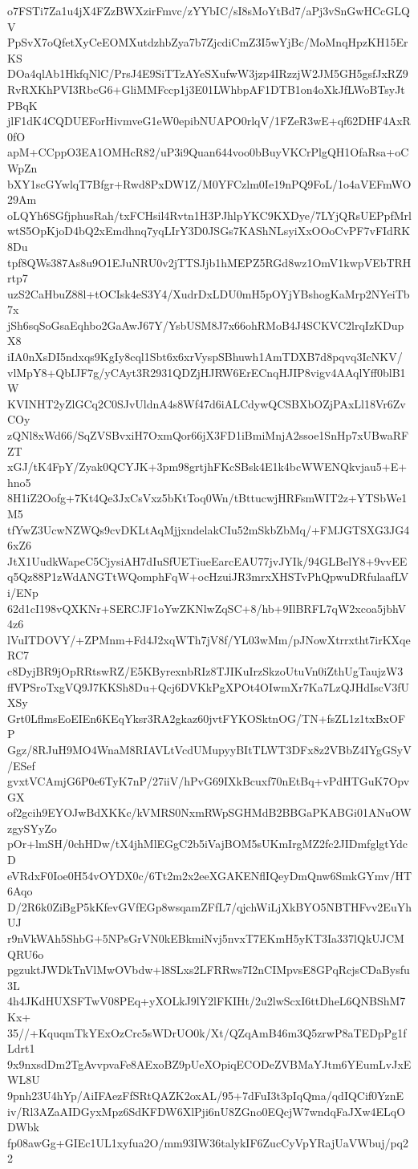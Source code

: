 o7FSTi7Za1u4jX4FZzBWXzirFmvc/zYYbIC/sI8sMoYtBd7/aPj3vSnGwHCcGLQV
PpSvX7oQfetXyCeEOMXutdzhbZya7b7ZjcdiCmZ3I5wYjBc/MoMnqHpzKH15ErKS
DOa4qlAb1HkfqNlC/PrsJ4E9SiTTzAYeSXufwW3jzp4IRzzjW2JM5GH5gsfJxRZ9
RvRXKhPVI3RbcG6+GliMMFccp1j3E01LWhbpAF1DTB1on4oXkJfLWoBTsyJtPBqK
jlF1dK4CQDUEForHivmveG1eW0epibNUAPO0rlqV/1FZeR3wE+qf62DHF4AxR0fO
apM+CCppO3EA1OMHcR82/uP3i9Quan644voo0bBuyVKCrPlgQH1OfaRsa+oCWpZn
bXY1scGYwlqT7Bfgr+Rwd8PxDW1Z/M0YFCzlm0Ie19nPQ9FoL/1o4aVEFmWO29Am
oLQYh6SGfjphusRah/txFCHsil4Rvtn1H3PJhlpYKC9KXDye/7LYjQRsUEPpfMrl
wtS5OpKjoD4bQ2xEmdhnq7yqLIrY3D0JSGs7KAShNLsyiXxOOoCvPF7vFIdRK8Du
tpf8QWs387As8u9O1EJuNRU0v2jTTSJjb1hMEPZ5RGd8wz1OmV1kwpVEbTRHrtp7
uzS2CaHbuZ88l+tOCIsk4eS3Y4/XudrDxLDU0mH5pOYjYBshogKaMrp2NYeiTb7x
jSh6sqSoGsaEqhbo2GaAwJ67Y/YsbUSM8J7x66ohRMoB4J4SCKVC2lrqIzKDupX8
iIA0nXsDI5ndxqs9KgIy8cql1Sbt6x6xrVyspSBhuwh1AmTDXB7d8pqvq3IcNKV/
vlMpY8+QbIJF7g/yCAyt3R2931QDZjHJRW6ErECnqHJIP8vigv4AAqlYff0blB1W
KVINHT2yZlGCq2C0SJvUldnA4s8Wf47d6iALCdywQCSBXbOZjPAxLl18Vr6ZvCOy
zQNl8xWd66/SqZVSBvxiH7OxmQor66jX3FD1iBmiMnjA2ssoe1SnHp7xUBwaRFZT
xGJ/tK4FpY/Zyak0QCYJK+3pm98grtjhFKcSBsk4E1k4bcWWENQkvjau5+E+hno5
8H1iZ2Oofg+7Kt4Qe3JxCsVxz5bKtToq0Wn/tBttucwjHRFsmWIT2z+YTSbWe1M5
tfYwZ3UcwNZWQs9cvDKLtAqMjjxndelakCIu52mSkbZbMq/+FMJGTSXG3JG46xZ6
JtX1UudkWapeC5CjysiAH7dIuSfUETiueEarcEAU77jvJYIk/94GLBelY8+9vvEE
q5Qz88P1zWdANGTtWQomphFqW+ocHzuiJR3mrxXHSTvPhQpwuDRfulaafLVi/ENp
62d1cI198vQXKNr+SERCJF1oYwZKNlwZqSC+8/hb+9IlBRFL7qW2xcoa5jbhV4z6
lVuITDOVY/+ZPMnm+Fd4J2xqWTh7jV8f/YL03wMm/pJNowXtrrxtht7irKXqeRC7
c8DyjBR9jOpRRtswRZ/E5KByrexnbRIz8TJIKuIrzSkzoUtuVn0iZthUgTaujzW3
ffVPSroTxgVQ9J7KKSh8Du+Qcj6DVKkPgXPOt4OIwmXr7Ka7LzQJHdIscV3fUXSy
Grt0LflmsEoEIEn6KEqYksr3RA2gkaz60jvtFYKOSktnOG/TN+fsZL1z1txBxOFP
Ggz/8RJuH9MO4WnaM8RIAVLtVcdUMupyyBItTLWT3DFx8z2VBbZ4IYgGSyV/ESef
gvxtVCAmjG6P0e6TyK7nP/27iiV/hPvG69IXkBcuxf70nEtBq+vPdHTGuK7OpvGX
of2gcih9EYOJwBdXKKc/kVMRS0NxmRWpSGHMdB2BBGaPKABGi01ANuOWzgySYyZo
pOr+lmSH/0chHDw/tX4jhMlEGgC2b5iVajBOM5sUKmIrgMZ2fc2JIDmfglgtYdcD
eVRdxF0Ioe0H54vOYDX0c/6Tt2m2x2eeXGAKENflIQeyDmQnw6SmkGYmv/HT6Aqo
D/2R6k0ZiBgP5kKfevGVfEGp8wsqamZFfL7/qjchWiLjXkBYO5NBTHFvv2EuYhUJ
r9nVkWAh5ShbG+5NPsGrVN0kEBkmiNvj5nvxT7EKmH5yKT3Ia337lQkUJCMQRU6o
pgzuktJWDkTnVlMwOVbdw+l8SLxs2LFRRws7I2nCIMpvsE8GPqRcjsCDaBysfu3L
4h4JKdHUXSFTwV08PEq+yXOLkJ9lY2lFKIHt/2u2lwScxI6ttDheL6QNBShM7Kx+
35//+KquqmTkYExOzCrc5sWDrUO0k/Xt/QZqAmB46m3Q5zrwP8aTEDpPg1fLdrt1
9x9nxsdDm2TgAvvpvaFe8AExoBZ9pUeXOpiqECODeZVBMaYJtm6YEumLvJxEWL8U
9pnh23U4hYp/AiIFAezFfSRtQAZK2oxAL/95+7dFuI3t3pIqQma/qdIQCif0YznE
iv/Rl3AZaAIDGyxMpz6SdKFDW6XlPji6nU8ZGno0EQcjW7wndqFaJXw4ELqODWbk
fp08awGg+GIEc1UL1xyfua2O/mm93IW36talykIF6ZucCyVpYRajUaVWbuj/pq22
